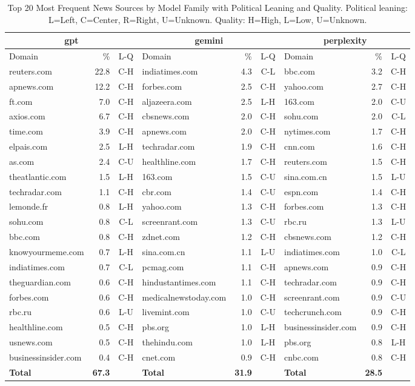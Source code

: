 \begin{table*}[htbp]
\centering
\caption{Top 20 Most Frequent News Sources by Model Family with Political Leaning and Quality. Political leaning: L=Left, C=Center, R=Right, U=Unknown. Quality: H=High, L=Low, U=Unknown.}
\label{tab:top_news_sources}
\begin{tabular}{lrc|lrc|lrc}
\toprule
\multicolumn{3}{c|}{\textbf{gpt}} & \multicolumn{3}{c|}{\textbf{gemini}} & \multicolumn{3}{c}{\textbf{perplexity}} \\
\midrule
Domain & \% & L-Q & Domain & \% & L-Q & Domain & \% & L-Q \\
\midrule
reuters.com & 22.8 & C-H & indiatimes.com & 4.3 & C-L & bbc.com & 3.2 & C-H \\
apnews.com & 12.2 & C-H & forbes.com & 2.5 & C-H & yahoo.com & 2.7 & C-H \\
ft.com & 7.0 & C-H & aljazeera.com & 2.5 & L-H & 163.com & 2.0 & C-U \\
axios.com & 6.7 & C-H & cbsnews.com & 2.0 & C-H & sohu.com & 2.0 & C-L \\
time.com & 3.9 & C-H & apnews.com & 2.0 & C-H & nytimes.com & 1.7 & C-H \\
elpais.com & 2.5 & L-H & techradar.com & 1.9 & C-H & cnn.com & 1.6 & C-H \\
as.com & 2.4 & C-U & healthline.com & 1.7 & C-H & reuters.com & 1.5 & C-H \\
theatlantic.com & 1.5 & L-H & 163.com & 1.5 & C-U & sina.com.cn & 1.5 & L-U \\
techradar.com & 1.1 & C-H & cbr.com & 1.4 & C-U & espn.com & 1.4 & C-H \\
lemonde.fr & 0.8 & L-H & yahoo.com & 1.3 & C-H & forbes.com & 1.3 & C-H \\
sohu.com & 0.8 & C-L & screenrant.com & 1.3 & C-U & rbc.ru & 1.3 & L-U \\
bbc.com & 0.8 & C-H & zdnet.com & 1.2 & C-H & cbsnews.com & 1.2 & C-H \\
knowyourmeme.com & 0.7 & L-H & sina.com.cn & 1.1 & L-U & indiatimes.com & 1.0 & C-L \\
indiatimes.com & 0.7 & C-L & pcmag.com & 1.1 & C-H & apnews.com & 0.9 & C-H \\
theguardian.com & 0.6 & C-H & hindustantimes.com & 1.1 & C-H & techradar.com & 0.9 & C-H \\
forbes.com & 0.6 & C-H & medicalnewstoday.com & 1.0 & C-H & screenrant.com & 0.9 & C-U \\
rbc.ru & 0.6 & L-U & livemint.com & 1.0 & C-U & techcrunch.com & 0.9 & C-H \\
healthline.com & 0.5 & C-H & pbs.org & 1.0 & L-H & businessinsider.com & 0.9 & C-H \\
usnews.com & 0.5 & C-H & thehindu.com & 1.0 & L-H & pbs.org & 0.8 & L-H \\
businessinsider.com & 0.4 & C-H & cnet.com & 0.9 & C-H & cnbc.com & 0.8 & C-H \\
\midrule
\textbf{Total} & \textbf{67.3} &  & \textbf{Total} & \textbf{31.9} &  & \textbf{Total} & \textbf{28.5} &  \\
\bottomrule
\end{tabular}
\end{table*}